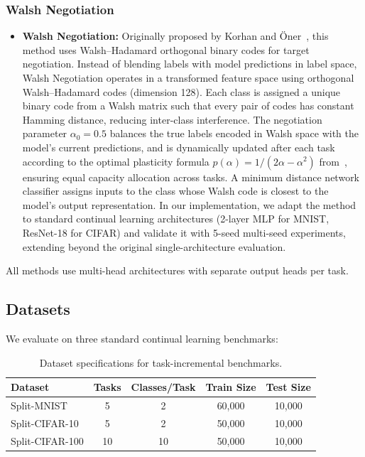 \documentclass[preprint,review,12pt]{elsarticle}
\begin{document}
\subsubsection{Walsh Negotiation}
\begin{itemize}
\item \textbf{Walsh Negotiation:} Originally proposed by Korhan and {\"O}ner~\cite{korhan2023negotiated}, this method uses Walsh--Hadamard orthogonal binary codes for target negotiation. Instead of blending labels with model predictions in label space, Walsh Negotiation operates in a transformed feature space using orthogonal Walsh--Hadamard codes (dimension 128). Each class is assigned a unique binary code from a Walsh matrix such that every pair of codes has constant Hamming distance, reducing inter-class interference. The negotiation parameter $\alpha_0 = 0.5$ balances the true labels encoded in Walsh space with the model's current predictions, and is dynamically updated after each task according to the optimal plasticity formula $p(\alpha) = 1/(2\alpha - \alpha^2)$ from~\cite{korhan2023negotiated}, ensuring equal capacity allocation across tasks. A minimum distance network classifier assigns inputs to the class whose Walsh code is closest to the model's output representation. In our implementation, we adapt the method to standard continual learning architectures (2-layer MLP for MNIST, ResNet-18 for CIFAR) and validate it with 5-seed multi-seed experiments, extending beyond the original single-architecture evaluation.
\end{itemize}

All methods use multi-head architectures with separate output heads per task.

\subsection{Datasets}

We evaluate on three standard continual learning benchmarks:

\begin{table}[h]
\centering
\caption{Dataset specifications for task-incremental benchmarks.}
\label{tab:datasets}
\begin{tabular}{lcccc}
\toprule
Dataset & Tasks & Classes/Task & Train Size & Test Size \\
\midrule
Split-MNIST & 5 & 2 & 60,000 & 10,000 \\
Split-CIFAR-10 & 5 & 2 & 50,000 & 10,000 \\
Split-CIFAR-100 & 10 & 10 & 50,000 & 10,000 \\
\bottomrule
\end{tabular}
\end{table}
\end{document}
